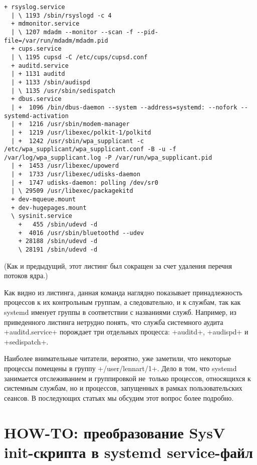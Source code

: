 \documentclass[10pt,oneside,a4paper]{article}
\begin{document}
\begin{landscape}
\begin{Verbatim}[fontsize=\small]
  + rsyslog.service
  | \ 1193 /sbin/rsyslogd -c 4
  + mdmonitor.service
  | \ 1207 mdadm --monitor --scan -f --pid-file=/var/run/mdadm/mdadm.pid
  + cups.service
  | \ 1195 cupsd -C /etc/cups/cupsd.conf
  + auditd.service
  | + 1131 auditd
  | + 1133 /sbin/audispd
  | \ 1135 /usr/sbin/sedispatch
  + dbus.service
  | +  1096 /bin/dbus-daemon --system --address=systemd: --nofork --systemd-activation
  | +  1216 /usr/sbin/modem-manager
  | +  1219 /usr/libexec/polkit-1/polkitd
  | +  1242 /usr/sbin/wpa_supplicant -c /etc/wpa_supplicant/wpa_supplicant.conf -B -u -f /var/log/wpa_supplicant.log -P /var/run/wpa_supplicant.pid
  | +  1453 /usr/libexec/upowerd
  | +  1733 /usr/libexec/udisks-daemon
  | +  1747 udisks-daemon: polling /dev/sr0
  | \ 29509 /usr/libexec/packagekitd
  + dev-mqueue.mount
  + dev-hugepages.mount
  \ sysinit.service
    +   455 /sbin/udevd -d
    +  4016 /usr/sbin/bluetoothd --udev
    + 28188 /sbin/udevd -d
    \ 28191 /sbin/udevd -d
\end{Verbatim}
(Как и предыдущий, этот листинг был сокращен за счет удаления перечня потоков
ядра.)
\end{landscape}

Как видно из листинга, данная команда наглядно показывает принадлежность
процессов к их контрольным группам, а следовательно, и к службам, так как
systemd именует группы в соответствии с названиями служб. Например, из
приведенного листинга нетрудно понять, что служба системного аудита
+auditd.service+ порождает три отдельных процесса: +auditd+,
+audispd+ и +sedispatch+.

Наиболее внимательные читатели, вероятно, уже заметили, что некоторые процессы
помещены в группу +/user/lennart/1+. Дело в том, что systemd занимается
отслеживанием и группировкой не~только процессов, относящихся к системным
службам, но и процессов, запущенных в рамках пользовательских сеансов. В
последующих статьях мы обсудим этот вопрос более подробно. 

\section{HOW-TO: преобразование SysV init-скрипта в systemd service-файл}
\label{sec:convert}
\end{document}

